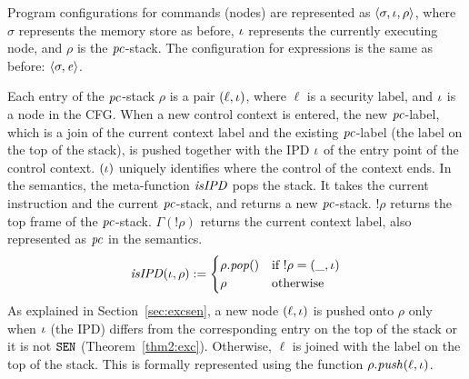 Program configurations for commands (nodes) are
represented as $\langle \sigma, \iota, \rho \rangle$, where
$\sigma$ represents the memory store as before, $\iota$ represents the
currently executing node, 
and $\rho$ is the $\mathit{pc}$-stack. The configuration for expressions is
the same as before: $\langle \sigma, \mathit{e} \rangle$. 


Each entry of the $\mathit{pc}$-stack $\rho$ is a pair $(\ell, \iota)$,
where $\ell$ is a security label, and $\iota$ is a node in the
CFG. When a new control context is entered, the new $\mathit{pc}$-label, which
is a join of the current context label and the existing $\mathit{pc}$-label
(the label on the top of the stack), is pushed together with the IPD
$\iota$ of the entry point of the control  context. $(\iota)$ uniquely
identifies where the control of the context ends. In the semantics,
the meta-function $\mathit{isIPD}$ pops the stack. It takes the current 
instruction and the current $\mathit{pc}$-stack, and returns a new
$\mathit{pc}$-stack. $!\rho$ returns the top frame of the
$\mathit{pc}$-stack. $\Gamma(!\rho)$ returns the current context 
label, also represented as $\mathit{pc}$ in the semantics.
\begin{equation*}
 \mathit{isIPD}(\iota, \rho) := 
 \begin{cases}
   \rho.\mathit{pop()} & \mbox{if}~ !\rho = (\_, \iota)
\\ \rho & \mbox{otherwise}
 \end{cases}
\end{equation*} 
As explained in Section~\ref{sec:excsen}, a new node $(\ell,
\iota)$ is pushed onto $\rho$ only when $\iota$ (the IPD)
differs from the corresponding entry on the top of the stack or it is
not $\texttt{SEN}$ (Theorem~\ref{thm2:exc}). Otherwise, $\ell$ is joined 
with the label on the top of the stack. This is formally represented 
using the function $\rho.\mathit{push}(\ell, \iota)$. 

